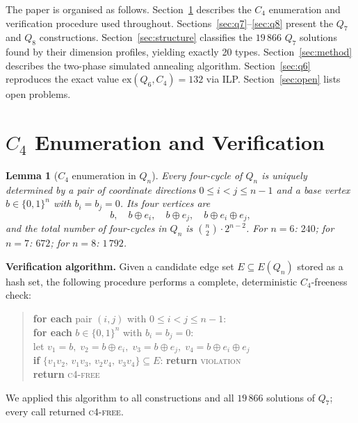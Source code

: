 \documentclass[12pt,a4paper]{article}
\newtheorem{lemma}[theorem]{Lemma}
\theoremstyle{definition}
\newcommand{\ex}{\mathrm{ex}}
\begin{document}
The paper is organised as follows.
Section~\ref{sec:verify} describes the $C_4$ enumeration and verification
procedure used throughout.
Sections~\ref{sec:q7}--\ref{sec:q8} present the $Q_7$ and $Q_8$ constructions.
Section~\ref{sec:structure} classifies the $19\,866$ $Q_7$ solutions found
by their dimension profiles, yielding exactly 20 types.
Section~\ref{sec:method} describes the two-phase simulated annealing algorithm.
Section~\ref{sec:q6} reproduces the exact value $\ex(Q_6,C_4)=132$ via ILP.
Section~\ref{sec:open} lists open problems.

\section{$C_4$ Enumeration and Verification}\label{sec:verify}

\begin{lemma}[$C_4$ enumeration in $Q_n$]\label{lem:c4}
Every four-cycle of $Q_n$ is uniquely determined by a pair of coordinate
directions $0\le i<j\le n-1$ and a base vertex $b\in\{0,1\}^n$ with
$b_i=b_j=0$.  Its four vertices are
\[
  b,\quad b\oplus e_i,\quad b\oplus e_j,\quad b\oplus e_i\oplus e_j,
\]
and the total number of four-cycles in $Q_n$ is $\binom{n}{2}\cdot2^{n-2}$.
For $n=6$: $240$; for $n=7$: $672$; for $n=8$: $1\,792$.
\end{lemma}

\noindent\textbf{Verification algorithm.}\quad
Given a candidate edge set $E\subseteq E(Q_n)$ stored as a hash set,
the following procedure performs a complete, deterministic $C_4$-freeness check:
\begin{quote}\small
\textbf{for each} pair $(i,j)$ with $0\le i<j\le n-1$:\\
\quad\textbf{for each} $b\in\{0,1\}^n$ with $b_i=b_j=0$:\\
\quad\quad let $v_1=b,\;v_2=b\oplus e_i,\;v_3=b\oplus e_j,\;v_4=b\oplus e_i\oplus e_j$\\
\quad\quad \textbf{if} $\{v_1v_2,\,v_1v_3,\,v_2v_4,\,v_3v_4\}\subseteq E$:
  \textbf{return} \textsc{violation}\\
\textbf{return} \textsc{c4-free}
\end{quote}
We applied this algorithm to all constructions and all $19\,866$ solutions
of $Q_7$; every call returned \textsc{c4-free}.

\end{document}
